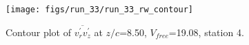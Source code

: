\begin{figure}[H]
\centering
\texttt{[image: figs/run\_33/run\_33\_rw\_contour]}
\caption{Contour plot of $\overline{v_{r}^{\prime} v_{z}^{\prime}}$ at $z/c$=8.50, $V_{free}$=19.08, station 4.}
\label{fig:run_33_rw_contour}
\end{figure}


